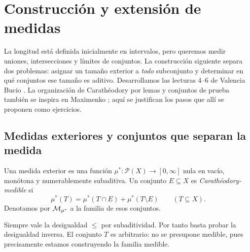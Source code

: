 \chapter{Construcción y extensión de medidas}\label{cap:v2-03}
La longitud está definida inicialmente en intervalos, pero queremos medir uniones, intersecciones y límites de conjuntos. La construcción siguiente separa dos problemas: asignar un tamaño exterior a \emph{todo} subconjunto y determinar en qué conjuntos ese tamaño es aditivo. Desarrollamos las lecturas 4--6 de Valencia Bucio \cite{valencia2}. La organización de Carathéodory por lemas y conjuntos de prueba también se inspira en Maximenko \cite{maximenkoCaratheodory}; aquí se justifican los pasos que allí se proponen como ejercicios.

\section{Medidas exteriores y conjuntos que separan la medida}\label{lectura:v2-04}
\begin{definicion}
Una medida exterior es una función $\mu^*:\mathcal P(X)\to[0,\infty]$ nula en vacío, monótona y numerablemente subaditiva. Un conjunto $E\subseteq X$ es \emph{Carathéodory-medible} si
\[\mu^*(T)=\mu^*(T\cap E)+\mu^*(T\setminus E)\qquad(T\subseteq X).\]
Denotamos por $\mathcal M_{\mu^*}$ a la familia de esos conjuntos.
\end{definicion}
Siempre vale la desigualdad $\le$ por subaditividad. Por tanto basta probar la desigualdad inversa. El conjunto $T$ es arbitrario: no se presupone medible, pues precisamente estamos construyendo la familia medible.

